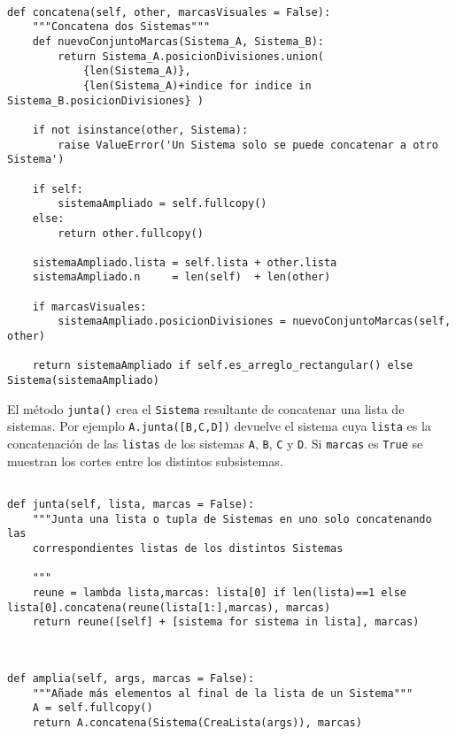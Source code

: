 \documentclass[11pt]{report}
\begin{document}
\begin{verbatim}

def concatena(self, other, marcasVisuales = False):
    """Concatena dos Sistemas"""    
    def nuevoConjuntoMarcas(Sistema_A, Sistema_B):
        return Sistema_A.posicionDivisiones.union(
            {len(Sistema_A)},
            {len(Sistema_A)+indice for indice in Sistema_B.posicionDivisiones} )
    
    if not isinstance(other, Sistema):
        raise ValueError('Un Sistema solo se puede concatenar a otro Sistema')

    if self:
        sistemaAmpliado = self.fullcopy()
    else:
        return other.fullcopy()
        
    sistemaAmpliado.lista = self.lista + other.lista
    sistemaAmpliado.n     = len(self)  + len(other)
        
    if marcasVisuales: 
        sistemaAmpliado.posicionDivisiones = nuevoConjuntoMarcas(self, other)

    return sistemaAmpliado if self.es_arreglo_rectangular() else Sistema(sistemaAmpliado)

\end{verbatim}

El método \texttt{junta()} crea el \texttt{Sistema} resultante de concatenar una
lista de sistemas. Por ejemplo \texttt{A.junta([B,C,D])} devuelve el sistema
cuya \texttt{lista} es la concatenación de las \texttt{listas} de los sistemas \texttt{A},
\texttt{B}, \texttt{C} y \texttt{D}. Si \texttt{marcas} es \texttt{True} se muestran los cortes entre los
distintos subsistemas.
\begin{verbatim}

def junta(self, lista, marcas = False):
    """Junta una lista o tupla de Sistemas en uno solo concatenando las
    correspondientes listas de los distintos Sistemas

    """
    reune = lambda lista,marcas: lista[0] if len(lista)==1 else lista[0].concatena(reune(lista[1:],marcas), marcas)    
    return reune([self] + [sistema for sistema in lista], marcas)
    
\end{verbatim}

\begin{verbatim}

def amplia(self, args, marcas = False):
    """Añade más elementos al final de la lista de un Sistema"""
    A = self.fullcopy()
    return A.concatena(Sistema(CreaLista(args)), marcas)

\end{verbatim}
\end{document}
